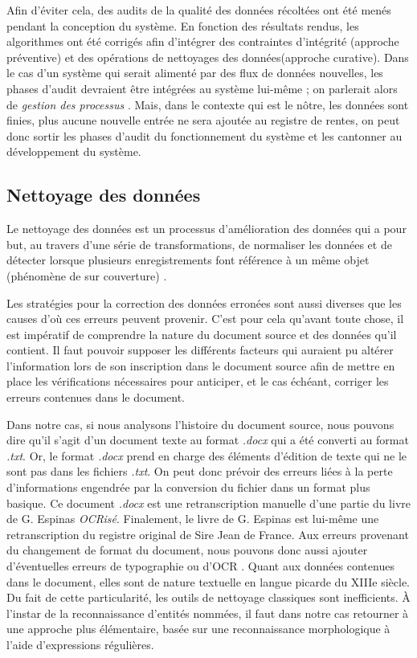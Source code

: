 Afin d'éviter cela, des audits de la qualité des données récoltées ont été menés pendant la conception du système. En fonction des résultats rendus, les algorithmes ont été corrigés afin d'intégrer des contraintes d'intégrité (approche préventive) et des opérations de nettoyages des données(approche curative).
Dans le cas d'un système qui serait alimenté par des flux de données nouvelles, les phases d'audit devraient être intégrées au système lui-même ; on parlerait alors de \textit{gestion des processus} \parencite{berti-equille_qualite_2004}. Mais, dans le contexte qui est le nôtre, les données sont finies, plus aucune nouvelle entrée ne sera ajoutée au registre de rentes, on peut donc sortir les phases d'audit du fonctionnement du système et les cantonner au développement du système.

\subsection{Nettoyage des données}
Le nettoyage des données est un processus d'amélioration des données qui a pour but, au travers d'une série de transformations, de normaliser les données et de détecter lorsque plusieurs enregistrements font référence à un même objet (phénomène de sur couverture) \parencite{berti-equille_qualite_2004}.

Les stratégies pour la correction des données erronées sont aussi diverses que les causes d'où ces erreurs peuvent provenir. C'est pour cela qu'avant toute chose, il est impératif de comprendre la nature du document source et des données qu'il contient. Il faut pouvoir supposer les différents facteurs qui auraient pu altérer l'information lors de son inscription dans le document source afin de mettre en place les vérifications nécessaires pour anticiper, et le cas échéant, corriger les erreurs contenues dans le document.

Dans notre cas, si nous analysons \og l'histoire \fg{} du document source, nous pouvons dire qu'il s'agit d'un document texte au format \textit{.docx} qui  a été converti au format \textit{.txt}. Or, le format \textit{.docx} prend en charge des éléments d'édition de texte qui ne le sont pas dans les fichiers \textit{.txt}. On peut donc prévoir des erreurs liées à la perte d'informations engendrée par la conversion du fichier dans un format plus basique. 
Ce document \textit{.docx} est une retranscription manuelle d'une partie du livre de G. Espinas \textit{OCRisé}.
Finalement, le livre de G. Espinas est lui-même une retranscription du registre original de Sire Jean de France. Aux erreurs provenant du changement de format du document, nous pouvons donc aussi ajouter d'éventuelles erreurs de typographie ou d'OCR \parencite{berti-equille_qualite_2004}.
Quant aux données contenues dans le document, elles sont de nature textuelle en langue picarde du XIIIe siècle. Du fait de cette particularité, les outils de nettoyage classiques sont inefficients. À l’instar de la reconnaissance d'entités nommées, il faut dans notre cas retourner à une approche plus élémentaire, basée sur une reconnaissance morphologique à l'aide d'expressions régulières. 

